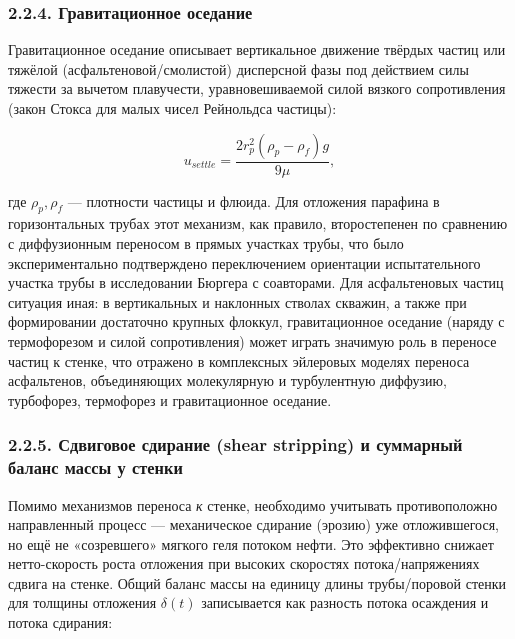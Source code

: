 \documentclass[11pt]{extarticle}
\begin{document}
\subsubsection{2.2.4. Гравитационное оседание}\label{ux433ux440ux430ux432ux438ux442ux430ux446ux438ux43eux43dux43dux43eux435-ux43eux441ux435ux434ux430ux43dux438ux435}

Гравитационное оседание описывает вертикальное движение твёрдых частиц или тяжёлой (асфальтеновой/смолистой) дисперсной фазы под действием силы тяжести за вычетом плавучести, уравновешиваемой силой вязкого сопротивления (закон Стокса для малых чисел Рейнольдса частицы):

\[
u_{settle} = \frac{2 r_p^2 (\rho_p - \rho_f) g}{9\mu},
\]

где \(\rho_p, \rho_f\) --- плотности частицы и флюида. Для отложения парафина в горизонтальных трубах этот механизм, как правило, второстепенен по сравнению с диффузионным переносом в прямых участках трубы, что было экспериментально подтверждено переключением ориентации испытательного участка трубы в исследовании Бюргера с соавторами. Для асфальтеновых частиц ситуация иная: в вертикальных и наклонных стволах скважин, а также при формировании достаточно крупных флоккул, гравитационное оседание (наряду с термофорезом и силой сопротивления) может играть значимую роль в переносе частиц к стенке, что отражено в комплексных эйлеровых моделях переноса асфальтенов, объединяющих молекулярную и турбулентную диффузию, турбофорез, термофорез и гравитационное оседание.

\subsubsection{2.2.5. Сдвиговое сдирание (shear stripping) и суммарный баланс массы у стенки}\label{ux441ux434ux432ux438ux433ux43eux432ux43eux435-ux441ux434ux438ux440ux430ux43dux438ux435-shear-stripping-ux438-ux441ux443ux43cux43cux430ux440ux43dux44bux439-ux431ux430ux43bux430ux43dux441-ux43cux430ux441ux441ux44b-ux443-ux441ux442ux435ux43dux43aux438}

Помимо механизмов переноса \emph{к} стенке, необходимо учитывать противоположно направленный процесс --- механическое сдирание (эрозию) уже отложившегося, но ещё не «созревшего» мягкого геля потоком нефти. Это эффективно снижает нетто-скорость роста отложения при высоких скоростях потока/напряжениях сдвига на стенке. Общий баланс массы на единицу длины трубы/поровой стенки для толщины отложения \(\delta(t)\) записывается как разность потока осаждения и потока сдирания:
\end{document}

